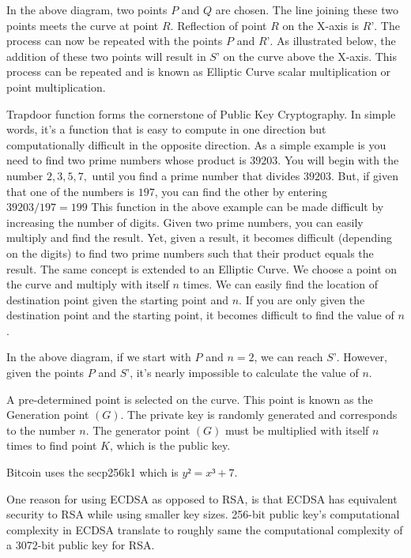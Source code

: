 \documentclass{article}
\begin{document}
In the above diagram, two points $P$ and $Q$ are chosen. The line joining these two points meets the curve at point $R$. Reflection of point $R$ on the X-axis is $R’$.
The process can now be repeated with the points $P$ and $R’$. As illustrated below, the addition of these two points will result in $S’$ on the curve above the X-axis. This process can be repeated and is known as Elliptic Curve scalar multiplication or point multiplication.

Trapdoor function forms the cornerstone of Public Key Cryptography. In simple words, it’s a function that is easy to compute in one direction but computationally difficult in the opposite direction.
As a simple example is you need to find two prime numbers whose product is $39203$. You will begin with the number $2, 3, 5, 7,$ until you find a prime number that divides $39203$. But, if given that one of the numbers is $197$, you can find the other by entering $39203 / 197 = 199$
This function in the above example can be made difficult by increasing the number of digits. Given two prime numbers, you can easily multiply and find the result. Yet, given a result, it becomes difficult (depending on the digits) to find two prime numbers such that their product equals the result.
The same concept is extended to an Elliptic Curve. We choose a point on the curve and multiply with itself $n$ times. We can easily find the location of destination point given the starting point and $n$. If you are only given the destination point and the starting point, it becomes difficult to find the value of $n$.

In the above diagram, if we start with $P$ and $n=2$, we can reach $S’$. However, given the points $P$ and $S’$, it’s nearly impossible to calculate the value of $n$.



A pre-determined point is selected on the curve. This point is known as the Generation point $(G)$. The private key is randomly generated and corresponds to the number 
$n$. The generator point $(G)$ must be multiplied with itself $n$ times to find point $K$, which is the public key. \newline

Bitcoin uses the secp256k1 which is $y² = x³ + 7$. \newline

One reason for using ECDSA as opposed to RSA, is that ECDSA has equivalent security to RSA while using smaller key sizes. 256-bit public key's computational complexity in ECDSA translate to roughly same the computational complexity of a 3072-bit public key for RSA.
\end{document}
